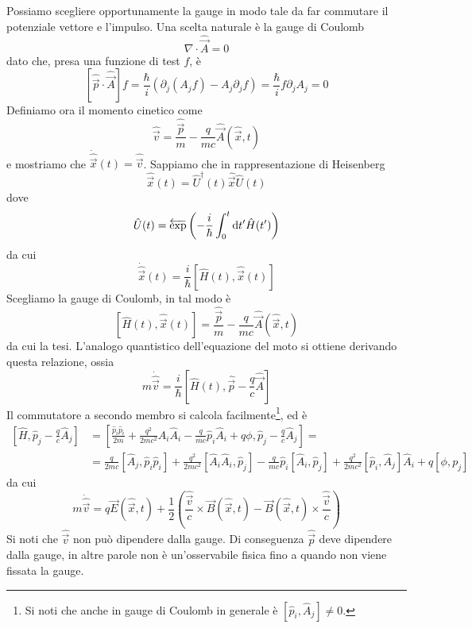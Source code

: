 \documentclass[a4paper, 11pt]{article}
\newcommand{\op}[1]{\hat{#1}}
\renewcommand{\op}[1]{\hat{#1}}
\newcommand{\ham}{\hat{H}}
\begin{document}
Possiamo scegliere opportunamente la gauge in modo tale da far commutare il potenziale vettore e l'impulso. Una scelta naturale è la gauge di Coulomb
\[\nabla\cdot\op{\vec{A}}=0\]
dato che, presa una funzione di test $f$, è
\[[\op{\vec{p}}\cdot\op{\vec{A}}]f=\frac{\hbar}{i}\left(\partial_j(A_jf)-A_j\partial_jf\right)=\frac{\hbar}{i}f\partial_jA_j=0\]
Definiamo ora il momento cinetico come
\[\op{\vec{v}}=\frac{\op{\vec{p}}}{m}-\frac{q}{mc}\op{\vec{A}}(\op{\vec{x}},t)\]
e mostriamo che $\dot{\op{\vec{x}}}(t)=\op{\vec{v}}$. Sappiamo che in rappresentazione di Heisenberg
\[\op{\vec{x}}(t)=\op U^\dagger(t)\op{\vec{x}}\op U(t)\]
dove
\[\op U(t)=\overleftarrow{\exp}\left(-\frac{i}{\hbar}\int_{0}^{t}\d t'\ham(t')\right)\]
da cui
\[\dot{\op{\vec{x}}}(t)=\frac{i}{\hbar}[\ham(t),\op{\vec{x}}(t)]\]
Scegliamo la gauge di Coulomb, in tal modo è
\[[\ham(t),\op{\vec{x}}(t)]=\frac{\op{\vec{p}}}{m}-\frac{q}{mc}\op{\vec{A}}(\op{\vec{x}},t)\]
da cui la tesi. L'analogo quantistico dell'equazione del moto si ottiene derivando questa relazione, ossia
\[m\dot{\op{\vec{v}}}=\frac{i}{\hbar}\left[\ham(t),\op{\vec{p}}-\frac{q}{c}\op{\vec{A}}\right]\]
Il commutatore a secondo membro si calcola facilmente\footnote{Si noti che anche in gauge di Coulomb in generale è $[\op p_i,\op A_j]\neq0$.}, ed è
\begin{align*}
	\left[\ham,\op p_j-\frac{q}{c}\op A_j\right]&=\left[\frac{\op p_i\op p_i}{2m}+\frac{q^2}{2mc^2}\op A_i\op A_i-\frac{q}{mc}\op p_i\op A_i+q\phi,\op p_j-\frac{q}{c}\op A_j\right]=\\&=\frac{q}{2mc}[\op A_j,\op p_i\op p_i]+\frac{q^2}{2mc^2}[\op A_i\op A_i,\op p_j]-\frac{q}{mc}\op p_i[\op A_i,\op p_j]+\frac{q^2}{2mc^2}[\op p_i,\op A_j]\op A_i+q[\phi,p_j]
\end{align*}
da cui
\[m\dot{\op{\vec{v}}}=q\vec{E}(\op{\vec{x}},t)+\frac{1}{2}\left(\frac{\op{\vec{v}}}{c}\times\vec{B}(\op{\vec{x}},t)-\vec{B}(\op{\vec{x}},t)\times\frac{\op{\vec{v}}}{c}\right)\]
Si noti che $\op{\vec{v}}$ non può dipendere dalla gauge. Di conseguenza $\op{\vec{p}}$ deve dipendere dalla gauge, in altre parole non è un'osservabile fisica fino a quando non viene fissata la gauge.
\end{document}
